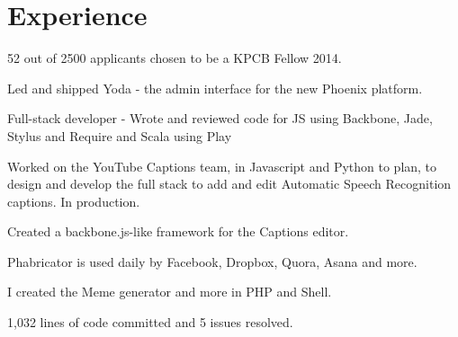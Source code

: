 \documentclass[]{deedy-resume-openfont}
\begin{document}
\hfill
\begin{minipage}[t]{0.66\textwidth} 


\section{Experience}
\sectionsep

\vspace{\topsep} %
\begin{tightemize}
\item 52 out of 2500 applicants chosen to be a KPCB Fellow 2014.
\item Led and shipped Yoda - the admin interface for the new Phoenix platform. 
\item Full-stack developer - Wrote and reviewed code for JS using Backbone, Jade, Stylus and Require and Scala using Play
\end{tightemize}
\sectionsep

\begin{tightemize}
\item Worked on the YouTube Captions team, in Javascript and Python to plan, to design and develop the full stack to add and edit Automatic Speech Recognition captions. In production.
\item Created a backbone.js-like framework for the Captions editor.
\end{tightemize}
\sectionsep

\begin{tightemize}
\item Phabricator is used daily by Facebook, Dropbox, Quora, Asana and more.
\item I created the Meme generator and more in PHP and Shell.
\item 1,032 lines of code committed and 5 issues resolved.
\end{tightemize}
\sectionsep


\end{minipage}
\end{document}
